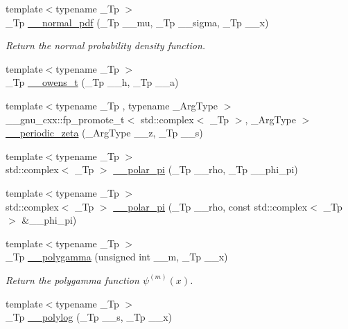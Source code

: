 \begin{DoxyCompactItemize}
{\footnotesize template$<$typename \+\_\+\+Tp $>$ }\\\+\_\+\+Tp \hyperlink{namespacestd_1_1____detail_a6211a0741c8e2dfb219fb52d072295f4}{\+\_\+\+\_\+normal\+\_\+pdf} (\+\_\+\+Tp \+\_\+\+\_\+mu, \+\_\+\+Tp \+\_\+\+\_\+sigma, \+\_\+\+Tp \+\_\+\+\_\+x)
\begin{DoxyCompactList}\small\item\em Return the normal probability density function. \end{DoxyCompactList}\item 
{\footnotesize template$<$typename \+\_\+\+Tp $>$ }\\\+\_\+\+Tp \hyperlink{namespacestd_1_1____detail_a5b50a9d8beaca5a637c8293ab01bf124}{\+\_\+\+\_\+owens\+\_\+t} (\+\_\+\+Tp \+\_\+\+\_\+h, \+\_\+\+Tp \+\_\+\+\_\+a)
\item 
{\footnotesize template$<$typename \+\_\+\+Tp , typename \+\_\+\+Arg\+Type $>$ }\\\+\_\+\+\_\+gnu\+\_\+cxx\+::fp\+\_\+promote\+\_\+t$<$ std\+::complex$<$ \+\_\+\+Tp $>$, \+\_\+\+Arg\+Type $>$ \hyperlink{namespacestd_1_1____detail_a1d65d34f43558441e4ed83d84dbc9ddf}{\+\_\+\+\_\+periodic\+\_\+zeta} (\+\_\+\+Arg\+Type \+\_\+\+\_\+z, \+\_\+\+Tp \+\_\+\+\_\+s)
\item 
{\footnotesize template$<$typename \+\_\+\+Tp $>$ }\\std\+::complex$<$ \+\_\+\+Tp $>$ \hyperlink{namespacestd_1_1____detail_ac69e259ad511fcc7a54c6ec315adcfa4}{\+\_\+\+\_\+polar\+\_\+pi} (\+\_\+\+Tp \+\_\+\+\_\+rho, \+\_\+\+Tp \+\_\+\+\_\+phi\+\_\+pi)
\item 
{\footnotesize template$<$typename \+\_\+\+Tp $>$ }\\std\+::complex$<$ \+\_\+\+Tp $>$ \hyperlink{namespacestd_1_1____detail_a627c0e19f6b3e90af25735f351662d53}{\+\_\+\+\_\+polar\+\_\+pi} (\+\_\+\+Tp \+\_\+\+\_\+rho, const std\+::complex$<$ \+\_\+\+Tp $>$ \&\+\_\+\+\_\+phi\+\_\+pi)
\item 
{\footnotesize template$<$typename \+\_\+\+Tp $>$ }\\\+\_\+\+Tp \hyperlink{namespacestd_1_1____detail_a25cc1b7c8adbc3b0fc8d4487ab23571c}{\+\_\+\+\_\+polygamma} (unsigned int \+\_\+\+\_\+m, \+\_\+\+Tp \+\_\+\+\_\+x)
\begin{DoxyCompactList}\small\item\em Return the polygamma function $ \psi^{(m)}(x) $. \end{DoxyCompactList}\item 
{\footnotesize template$<$typename \+\_\+\+Tp $>$ }\\\+\_\+\+Tp \hyperlink{namespacestd_1_1____detail_a17fb8cea11706f319aaea277188a29c8}{\+\_\+\+\_\+polylog} (\+\_\+\+Tp \+\_\+\+\_\+s, \+\_\+\+Tp \+\_\+\+\_\+x)

\end{DoxyCompactItemize}
